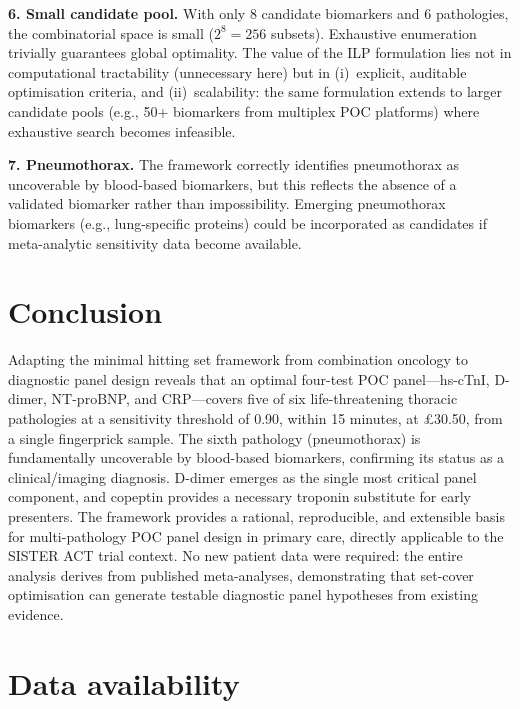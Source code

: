 \documentclass[times, twoside, watermark]{zHenriquesLab-StyleBioRxiv}
\begin{document}
\textbf{6. Small candidate pool.} With only 8 candidate biomarkers and 6 pathologies, the combinatorial space is small ($2^8 = 256$ subsets). Exhaustive enumeration trivially guarantees global optimality. The value of the ILP formulation lies not in computational tractability (unnecessary here) but in (i)~explicit, auditable optimisation criteria, and (ii)~scalability: the same formulation extends to larger candidate pools (e.g., 50+ biomarkers from multiplex POC platforms) where exhaustive search becomes infeasible.

\textbf{7. Pneumothorax.} The framework correctly identifies pneumothorax as uncoverable by blood-based biomarkers, but this reflects the absence of a validated biomarker rather than impossibility. Emerging pneumothorax biomarkers (e.g., lung-specific proteins) could be incorporated as candidates if meta-analytic sensitivity data become available.


\section*{Conclusion}

Adapting the minimal hitting set framework from combination oncology to diagnostic panel design reveals that an optimal four-test POC panel---hs-cTnI, D-dimer, NT-proBNP, and CRP---covers five of six life-threatening thoracic pathologies at a sensitivity threshold of 0.90, within 15 minutes, at \pounds30.50, from a single fingerprick sample. The sixth pathology (pneumothorax) is fundamentally uncoverable by blood-based biomarkers, confirming its status as a clinical/imaging diagnosis. D-dimer emerges as the single most critical panel component, and copeptin provides a necessary troponin substitute for early presenters. The framework provides a rational, reproducible, and extensible basis for multi-pathology POC panel design in primary care, directly applicable to the SISTER ACT trial context. No new patient data were required: the entire analysis derives from published meta-analyses, demonstrating that set-cover optimisation can generate testable diagnostic panel hypotheses from existing evidence.


\section*{Data availability}
\end{document}
